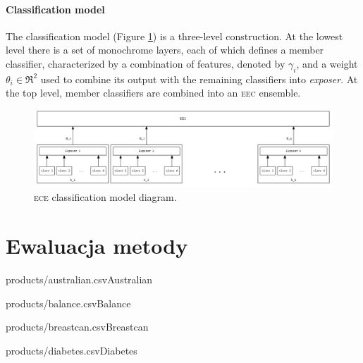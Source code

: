 \documentclass[]{article}
\begin{document}
\paragraph{Classification model}

The classification model (Figure \ref{fig:model}) is a three-level construction. At the lowest level there is a set of monochrome layers, each of which defines a member classifier, characterized by a combination of features, denoted by $\gamma_i$, and a weight $\theta_i \in \Re^2$ used to combine its output with the remaining classifiers into \emph{exposer}. At the top level, member classifiers are combined into an \textsc{eec} ensemble.

\begin{figure}[hbt]
	\center
  \includegraphics[width=\textwidth]{figures/ece_model}
  
  \caption{\textsc{ece} classification model diagram.}
	\label{fig:model}
\end{figure}

\section{Ewaluacja metody}

\begin{table}[!ht]
    \parbox{.45\linewidth}{
	    \begin{ride}{products/australian.csv}{Australian}\end{ride}
	}
	\hfill
    \parbox{.45\linewidth}{
	    \begin{ride}{products/balance.csv}{Balance}\end{ride}
	}
\end{table}

\begin{table}[!ht]
    \parbox{.45\linewidth}{
	    \begin{ride}{products/breastcan.csv}{Breastcan}\end{ride}
	}
	\hfill
    \parbox{.45\linewidth}{
	    \begin{ride}{products/diabetes.csv}{Diabetes}\end{ride}
	}
\end{table}
\end{document}
